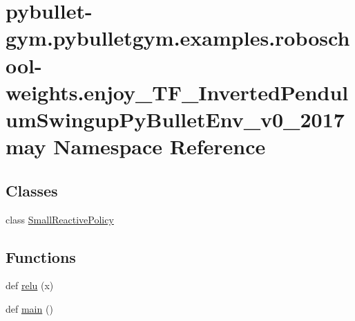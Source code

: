 \hypertarget{namespacepybullet-gym_1_1pybulletgym_1_1examples_1_1roboschool-weights_1_1enjoy___t_f___inverted49df41add915758d6f92d022ad22e9f0}{}\section{pybullet-\/gym.pybulletgym.\+examples.\+roboschool-\/weights.enjoy\+\_\+\+T\+F\+\_\+\+Inverted\+Pendulum\+Swingup\+Py\+Bullet\+Env\+\_\+v0\+\_\+2017may Namespace Reference}
\label{namespacepybullet-gym_1_1pybulletgym_1_1examples_1_1roboschool-weights_1_1enjoy___t_f___inverted49df41add915758d6f92d022ad22e9f0}
\subsection*{Classes}
\begin{DoxyCompactItemize}
\item 
class \hyperlink{classpybullet-gym_1_1pybulletgym_1_1examples_1_1roboschool-weights_1_1enjoy___t_f___inverted_pen3eeac26d45db9f331291535c39eeed36}{Small\+Reactive\+Policy}
\end{DoxyCompactItemize}
\subsection*{Functions}
\begin{DoxyCompactItemize}
\item 
def \hyperlink{namespacepybullet-gym_1_1pybulletgym_1_1examples_1_1roboschool-weights_1_1enjoy___t_f___inverted49df41add915758d6f92d022ad22e9f0_af54743621182f940ebc96bcbcf455912}{relu} (x)
\item 
def \hyperlink{namespacepybullet-gym_1_1pybulletgym_1_1examples_1_1roboschool-weights_1_1enjoy___t_f___inverted49df41add915758d6f92d022ad22e9f0_ab1e2a4c48ef928b3b414c1fc6b4c285f}{main} ()
\end{DoxyCompactItemize}
